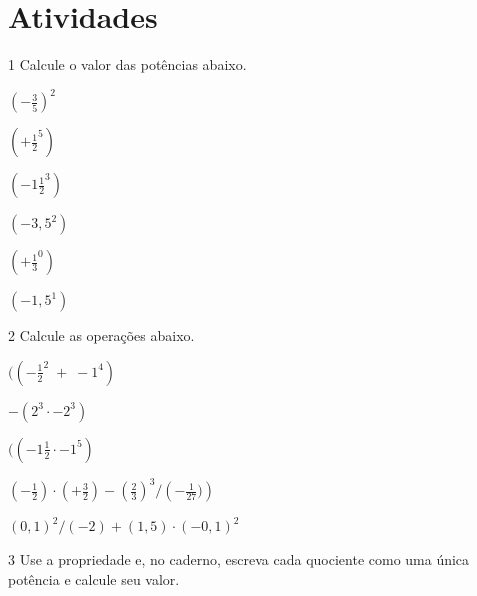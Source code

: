 \section{Atividades}

\num{1} Calcule o valor das potências abaixo.

\begin{escolha}
\item $\left( - \frac{3}{5}\right )^2$  
\item $( + \frac{1}{2}^5)$  
\item $( - 1\frac{1}{2}^3)$  
\item $( -3,5^2)$  
\item $( + \frac{1}{3}^0)$  
\item $(-1,5^1)$  
\end{escolha}


\num{2} Calcule as operações abaixo.

\begin{escolha}
\item $(( - \frac{1}{2}^2 \; + \; -1^4)$ 
\item $ - (2^3 \cdot -2^3)$ 
\item $(( - 1\frac{1}{2} \cdot -1^5)$ 
\item $\left ( - \frac{1}{2} \right) \cdot \left( + \frac{3}{2} \right) - \left ( \frac{2}{3} \right)^{3} / \left ( - \frac{1}{27}) \right)$  
\item $(0,1) ^2 / (-2) + (1,5) \cdot (-0,1)^2$ 
\end{escolha}







\num{3} Use a propriedade e, no caderno, escreva cada quociente como uma
única potência e calcule seu valor.


